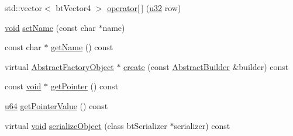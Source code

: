 \begin{DoxyCompactItemize}
\item 
std\+::vector$<$ bt\+Vector4 $>$ \mbox{\hyperlink{classnjli_1_1_image_aa3d366f9d5c3535ed96dd47b19f279ef}{operator\mbox{[}$\,$\mbox{]}}} (\mbox{\hyperlink{_util_8h_a10e94b422ef0c20dcdec20d31a1f5049}{u32}} row)
\item 
\mbox{\hyperlink{_thread_8h_af1e856da2e658414cb2456cb6f7ebc66}{void}} \mbox{\hyperlink{classnjli_1_1_image_a087eb5f8d9f51cc476f12f1d10a3cb95}{set\+Name}} (const char $\ast$name)
\item 
const char $\ast$ \mbox{\hyperlink{classnjli_1_1_image_ad41266885be835f3ee602311e20877a4}{get\+Name}} () const
\item 
virtual \mbox{\hyperlink{classnjli_1_1_abstract_factory_object}{Abstract\+Factory\+Object}} $\ast$ \mbox{\hyperlink{classnjli_1_1_image_a83a8876ae63b92804004cf3febe76573}{create}} (const \mbox{\hyperlink{classnjli_1_1_abstract_builder}{Abstract\+Builder}} \&builder) const
\item 
const \mbox{\hyperlink{_thread_8h_af1e856da2e658414cb2456cb6f7ebc66}{void}} $\ast$ \mbox{\hyperlink{classnjli_1_1_image_ac4ca71716ed832be357f15f8262c8448}{get\+Pointer}} () const
\item 
\mbox{\hyperlink{_util_8h_ad758b7a5c3f18ed79d2fcd23d9f16357}{u64}} \mbox{\hyperlink{classnjli_1_1_image_a4ffddf141a426a5a07d0ac19f1913811}{get\+Pointer\+Value}} () const
\item 
virtual \mbox{\hyperlink{_thread_8h_af1e856da2e658414cb2456cb6f7ebc66}{void}} \mbox{\hyperlink{classnjli_1_1_image_a4fc4bcd9d1930911474210c047372fc0}{serialize\+Object}} (class bt\+Serializer $\ast$serializer) const
\end{DoxyCompactItemize}
